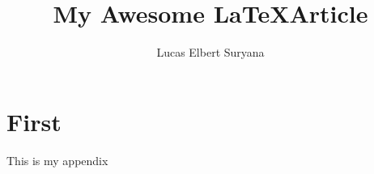 \documentclass[b5paper]{scrbook}
\title{My Awesome \LaTeX Article}
\author{Lucas Elbert Suryana}
\begin{document}
\frontmatter
\newcommand{\partialder}[1][t]{\frac{\partial}{\partial #1}}
\newcommand{\omegafrequency}{w_{\mathrm{res}}}
\maketitle

\listoftodos
\tableofcontents

\mainmatter



\appendix
\chapter{First}
This is my appendix

\printbibliography[heading=bibintoc]
\end{document}
